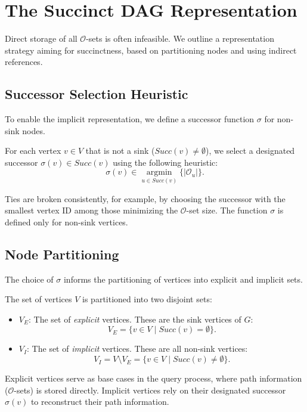 \section{The Succinct DAG Representation}
\label{sec:succinct_dag_representation}

Direct storage of all $\mathcal{O}$-sets is often infeasible. We outline a representation strategy aiming for succinctness, based on partitioning nodes and using indirect references.

\subsection*{Successor Selection Heuristic}
\label{subsec:successor_selection}

To enable the implicit representation, we define a successor function $\sigma$ for non-sink nodes.

\begin{definition}
    \label{def:sigma_function}
    For each vertex $v \in V$ that is not a sink ($Succ(v) \neq \emptyset$), we select a designated successor $\sigma(v) \in Succ(v)$ using the following heuristic:
    \[ \sigma(v) \in \underset{u \in Succ(v)}{\operatorname{argmin}} \{ |\mathcal{O}_u| \}. \]
\end{definition}
Ties are broken consistently, for example, by choosing the successor with the smallest vertex ID among those minimizing the $\mathcal{O}$-set size. The function $\sigma$ is defined only for non-sink vertices.

\subsection*{Node Partitioning}
\label{subsec:node_partitioning}

The choice of $\sigma$ informs the partitioning of vertices into explicit and implicit sets.

\begin{definition}
    \label{def:explicit_implicit}
    The set of vertices $V$ is partitioned into two disjoint sets:
    \begin{itemize}
        \item $V_E$: The set of \emph{explicit} vertices. These are the sink vertices of $G$:
              \[ V_E = \{ v \in V \mid Succ(v) = \emptyset \}. \]
        \item $V_I$: The set of \emph{implicit} vertices. These are all non-sink vertices:
              \[ V_I = V \setminus V_E = \{ v \in V \mid Succ(v) \neq \emptyset \}. \]
    \end{itemize}
    Explicit vertices serve as base cases in the query process, where path information ($\mathcal{O}$-sets) is stored directly. Implicit vertices rely on their designated successor $\sigma(v)$ to reconstruct their path information.
\end{definition}

